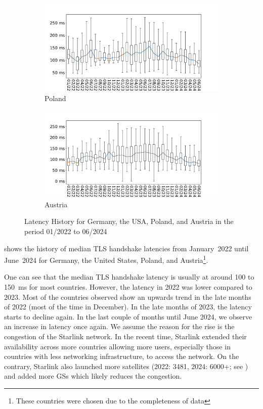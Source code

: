 \begin{figure}
\begin{subfigure}[b]{0.49\linewidth}
		\includegraphics[width=\linewidth]{chapters/4-results/latency/img/latency_2022_to_2024_Poland.pdf}
		\caption{Poland}
	\end{subfigure}
	\begin{subfigure}[b]{0.49\linewidth}
		\includegraphics[width=\linewidth]{chapters/4-results/latency/img/latency_2022_to_2024_Austria.pdf}
		\caption{Austria}
	\end{subfigure}
	\caption{Latency History for Germany, the USA, Poland, and Austria in the period 01/2022 to 06/2024}
	\label{fig:latency_wholerange}
\end{figure}

 shows the history of median TLS handshake
latencies from January~2022 until June~2024 for Germany, the United States,
Poland, and Austria\footnote{These countries were chosen due to the
	completeness of data}.

One can see that the median TLS handshake latency is usually at around 100 to
150~ms for most countries. However, the latency in 2022 was lower compared to
2023. Most of the countries observed show an upwards trend in the late months
of 2022 (most of the time in December). In the late months of 2023, the latency
starts to decline again. In the last couple of months until June 2024, we
observe an increase in latency once again. We assume the reason for the rise is
the congestion of the Starlink network. In the recent time, Starlink extended
their availability across more countries allowing more users, especially those
in countries with less networking infrastructure, to access the network. On the
contrary, Starlink also launched more satellites (2022: 3481, 2024: 6000+; see
) and added more \ac{GS}s which likely
reduces the congestion.

